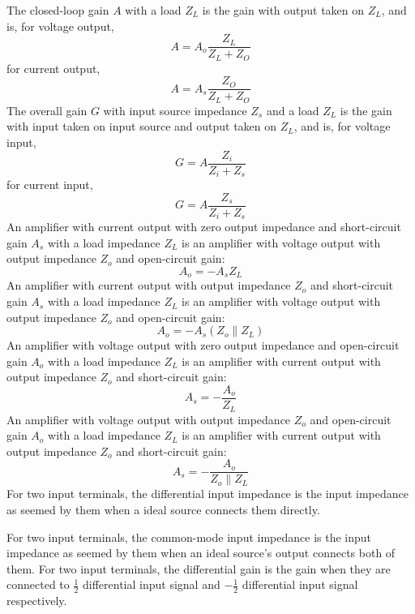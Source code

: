 \documentclass[a4paper,12pt]{report}
\begin{document}
The closed-loop gain $A$ with a load $Z_L$ is the gain with output taken on $Z_L$, and is, for voltage output,
\[A=A_o\frac{Z_L}{Z_L+Z_O}\]
for current output,
\[A=A_s\frac{Z_O}{Z_L+Z_O}\]
The overall gain $G$ with input source impedance $Z_s$ and a load $Z_L$ is the gain with input taken on input source and output taken on $Z_L$, and is, for voltage input,
\[G=A\frac{Z_i}{Z_i+Z_s}\]
for current input,
\[G=A\frac{Z_s}{Z_i+Z_s}\]
An amplifier with current output with zero output impedance and short-circuit gain $A_s$ with a load impedance $Z_L$ is an amplifier with voltage output with output impedance $Z_o$ and open-circuit gain:
\[A_o=-A_sZ_L\]
An amplifier with current output with output impedance $Z_o$ and short-circuit gain $A_s$ with a load impedance $Z_L$ is an amplifier with voltage output with output impedance $Z_o$ and open-circuit gain:
\[A_o=-A_s(Z_o\parallel Z_L)\]
An amplifier with voltage output with zero output impedance and open-circuit gain $A_o$ with a load impedance $Z_L$ is an amplifier with current output with output impedance $Z_o$ and short-circuit gain:
\[A_s=-\frac{A_o}{Z_L}\]
An amplifier with voltage output with output impedance $Z_o$ and open-circuit gain $A_o$ with a load impedance $Z_L$ is an amplifier with current output with output impedance $Z_o$ and short-circuit gain:
\[A_s=-\frac{A_o}{Z_o\parallel Z_L}\]
For two input terminals, the differential input impedance is the input impedance as seemed by them when a ideal source connects them directly.

For two input terminals, the common-mode input impedance is the input impedance as seemed by them when an ideal source's output connects both of them.
For two input terminals, the differential gain is the gain when they are connected to $\frac{1}{2}$ differential input signal and $-\frac{1}{2}$ differential input signal respectively.
\end{document}
